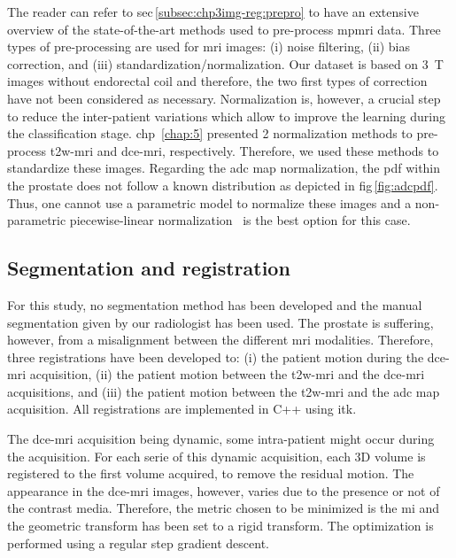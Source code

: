 The reader can refer to \acs{sec}\,\ref{subsec:chp3img-reg:prepro} to have an extensive overview of the state-of-the-art methods used to pre-process \ac{mpmri} data.
Three types of pre-processing are used for \ac{mri} images: (i) noise filtering, (ii) bias correction, and (iii) standardization/normalization.
Our dataset is based on \SI{3}{\tesla} images without endorectal coil and therefore, the two first types of correction have not been considered as necessary.
Normalization is, however, a crucial step to reduce the inter-patient variations which allow to improve the learning during the classification stage.
\Ac{chp}~\ref{chap:5} presented 2 normalization methods to pre-process \ac{t2w}-\ac{mri} and \ac{dce}-\ac{mri}, respectively.
Therefore, we used these methods to standardize these images.
Regarding the \ac{adc} map normalization, the \ac{pdf} within the prostate does not follow a known distribution as depicted in \acs{fig}\,\ref{fig:adcpdf}.
Thus, one cannot use a parametric model to normalize these images and a non-parametric piecewise-linear normalization~\cite{Nyul2000} is the best option for this case.

\subsection{Segmentation and registration}\label{subsec:chp6:method:Seg-Reg}

For this study, no segmentation method has been developed and the manual segmentation given by our radiologist has been used.
The prostate is suffering, however, from a misalignment between the different \ac{mri} modalities.
Therefore, three registrations have been developed to: (i) the patient motion during the \ac{dce}-\ac{mri} acquisition, (ii) the patient motion between the \ac{t2w}-\ac{mri} and the \ac{dce}-\ac{mri} acquisitions, and (iii) the patient motion between the \ac{t2w}-\ac{mri} and the \ac{adc} map acquisition.
All registrations are implemented in C++ using \ac{itk}.

The \ac{dce}-\ac{mri} acquisition being dynamic, some intra-patient might occur during the acquisition.
For each serie of this dynamic acquisition, each 3D volume is registered to the first volume acquired, to remove the residual motion.
The appearance in the \ac{dce}-\ac{mri} images, however, varies due to the presence or not of the contrast media.
Therefore, the metric chosen to be minimized is the \ac{mi} and the geometric transform has been set to a rigid transform.
The optimization is performed using a regular step gradient descent.

